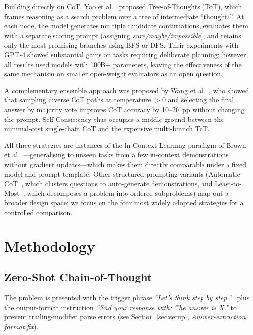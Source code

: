 \documentclass[conference]{IEEEtran}
\begin{document}
Building directly on CoT, Yao et al.~\cite{yao2023tot} proposed
Tree-of-Thoughts (ToT), which frames reasoning as a search problem
over a tree of intermediate ``thoughts''.
At each node, the model generates multiple candidate continuations,
evaluates them with a separate scoring prompt (assigning
\textit{sure/maybe/impossible}), and retains only the most promising
branches using BFS or DFS.
Their experiments with GPT-4 showed substantial gains on tasks
requiring deliberate planning; however, all results used models with
100B+ parameters, leaving the effectiveness of the same mechanism on
smaller open-weight evaluators as an open question.

A complementary ensemble approach was proposed by Wang et
al.~\cite{wang2022selfconsistency}, who showed that sampling diverse
CoT paths at temperature $>0$ and selecting the final answer by
majority vote improves CoT accuracy by 10--20~pp without changing the
prompt.
Self-Consistency thus occupies a middle ground between the
minimal-cost single-chain CoT and the expensive multi-branch ToT.

All three strategies are instances of the In-Context Learning paradigm
of Brown et al.~\cite{brown2020gpt3}---generalising to unseen tasks from
a few in-context demonstrations without gradient updates---which makes
them directly comparable under a fixed model and prompt template.
Other structured-prompting variants (Automatic
CoT~\cite{zhang2022autocot}, which clusters questions to auto-generate
demonstrations, and Least-to-Most~\cite{zhou2022ltm}, which decomposes a
problem into ordered subproblems) map out a broader design space; we
focus on the four most widely adopted strategies for a controlled
comparison.

\section{Methodology}
\label{sec:method}

\subsection{Zero-Shot Chain-of-Thought}
The problem is presented with the trigger phrase
\textit{``Let's think step by step.''}~\cite{kojima2022zeroshot}
plus the output-format instruction
\textit{``End your response with: The answer is X.''}
to prevent trailing-modifier parse errors
(see Section~\ref{sec:setup}, \emph{Answer-extraction format fix}).
\end{document}
